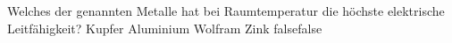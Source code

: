     {Welches der genannten Metalle hat bei Raumtemperatur die höchste elektrische Leitfähigkeit?}
    {Kupfer}
    {Aluminium}
    {Wolfram}
    {Zink}
    {false}{false}